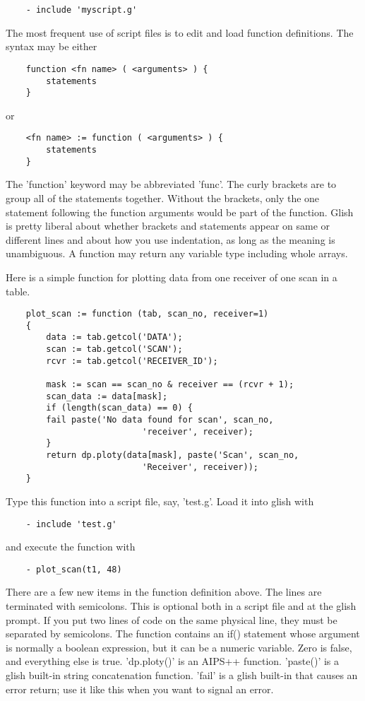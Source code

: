 \begin{verbatim}
	- include 'myscript.g'
\end{verbatim}

The most frequent use of script files is to edit and load function
definitions.  The syntax may be either

\begin{verbatim}
	function <fn name> ( <arguments> ) {
	    statements
	}
\end{verbatim}
or
\begin{verbatim}
	<fn name> := function ( <arguments> ) {
	    statements
	}
\end{verbatim}

The 'function' keyword may be abbreviated 'func'.  The curly brackets are
to group all of the statements together.  Without the brackets, only the
one statement following the function arguments would be part of the
function.  Glish is pretty liberal about whether brackets and statements
appear on same or different lines and about how you use indentation, as
long as the meaning is unambiguous.  A function may return any variable
type including whole arrays.

    Here is a simple function for plotting data from one receiver of one
scan in a table.

\begin{verbatim}
	plot_scan := function (tab, scan_no, receiver=1)
	{
	    data := tab.getcol('DATA');
	    scan := tab.getcol('SCAN');
	    rcvr := tab.getcol('RECEIVER_ID');

	    mask := scan == scan_no & receiver == (rcvr + 1);
	    scan_data := data[mask];
	    if (length(scan_data) == 0) {
		fail paste('No data found for scan', scan_no, 
                           'receiver', receiver);
	    }
	    return dp.ploty(data[mask], paste('Scan', scan_no, 
                           'Receiver', receiver));
	}
\end{verbatim}

Type this function into a script file, say, 'test.g'.  Load it into glish
with

\begin{verbatim}
	- include 'test.g'
\end{verbatim}

and execute the function with

\begin{verbatim}
	- plot_scan(t1, 48)
\end{verbatim}

    There are a few new items in the function definition above.  The lines
are terminated with semicolons.  This is optional both in a script file and
at the glish prompt.  If you put two lines of code on the same physical
line, they must be separated by semicolons.  The function contains an if()
statement whose argument is normally a boolean expression, but it can be a
numeric variable.  Zero is false, and everything else is true.  'dp.ploty()'
is an AIPS++ function.  'paste()' is a glish built-in string concatenation
function. 'fail' is a glish built-in that causes an error return; use
it like this when you want to signal an error.

